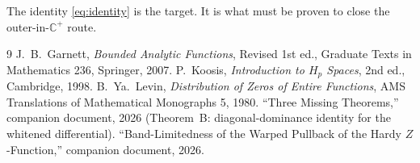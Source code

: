 \documentclass[11pt]{article}
\theoremstyle{definition}
\newcommand{\C}{\mathbb{C}}
\newcommand{\Cpls}{\C^+}
\begin{document}
The identity \eqref{eq:identity} is the target. It is what must be proven to close the outer-in-$\Cpls$ route.

\begin{thebibliography}{9}
 J.~B.~Garnett, \emph{Bounded Analytic Functions}, Revised 1st ed., Graduate Texts in Mathematics 236, Springer, 2007.
 P.~Koosis, \emph{Introduction to $H_p$ Spaces}, 2nd ed., Cambridge, 1998.
 B.~Ya.~Levin, \emph{Distribution of Zeros of Entire Functions}, AMS Translations of Mathematical Monographs 5, 1980.
 ``Three Missing Theorems,'' companion document, 2026 (Theorem~B: diagonal-dominance identity for the whitened differential).
 ``Band-Limitedness of the Warped Pullback of the Hardy $Z$-Function,'' companion document, 2026.
\end{thebibliography}
\end{document}
